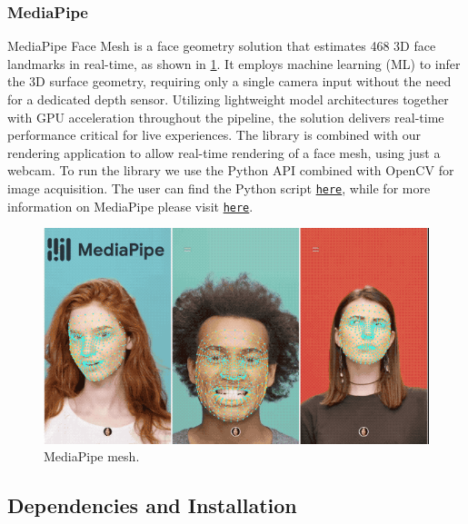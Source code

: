\subsubsection{MediaPipe}
MediaPipe Face Mesh is a face geometry solution that estimates 468
3D face landmarks in real-time, as shown in \ref{fig:mediapipe_mesh}. It
employs machine learning (ML) to infer the 3D surface geometry, requiring only a
single camera input without the need for a dedicated depth sensor. Utilizing
lightweight model architectures together with GPU acceleration throughout
the pipeline, the solution delivers real-time performance critical for
live experiences. The library is combined with our rendering application 
to allow real-time rendering of a face mesh, using just a webcam. To run the 
library we use the Python API combined with OpenCV for image acquisition.
The user can find the Python script 
\texttt{\href{https://github.com/amartsop/SkeletalAnimationMultiThreadFace/blob/master/face_mesh_server.py}{here}},
while for more information on MediaPipe please visit 
\texttt{\href{https://google.github.io/mediapipe/solutions/face_mesh.html}{here}}.
\begin{figure}
    \centering\includegraphics[width=1.0 \linewidth]{Figures/mediapie.png}
    \caption{MediaPipe mesh.}
    \label{fig:mediapipe_mesh}
\end{figure}

\subsection{Dependencies and Installation}

